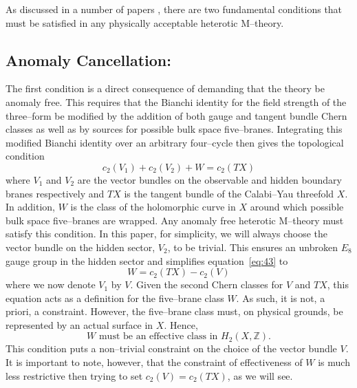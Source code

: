 \documentclass[a4paper,12pt]{article}
\numberwithin{equation}{section}
\theoremstyle{plain}
\begin{document}

As discussed in a number of papers \cite{nse, curio, lpt, GSW}, 
there are two fundamental conditions
that must be satisfied in any physically acceptable heterotic M--theory. 

\subsection*{Anomaly Cancellation:}

The first condition is a direct consequence of demanding that the theory be
anomaly free. This requires that the Bianchi identity for the field strength
of the three--form be modified by the addition of both gauge and tangent
bundle Chern classes as well as by sources for possible bulk space
five--branes. Integrating this modified Bianchi identity over an
arbitrary four--cycle then gives the topological condition
\[
c_{2}(V_{1})+c_{2}(V_{2})+W=c_{2}(TX)
\]
where $V_{1}$ and $V_{2}$ are the vector bundles on the observable and hidden
boundary branes respectively and $TX$ is the tangent bundle of the Calabi--Yau
threefold $X$. In addition, $W$ is the class of the holomorphic 
curve in $X$ around which possible bulk space five--branes are
wrapped. Any anomaly 
free heterotic M--theory must satisfy this condition. In this paper, for
simplicity, we will always choose the vector bundle on the hidden sector,
$V_{2}$, to be trivial. This ensures an unbroken $E_{8}$ gauge group in the
hidden sector and simplifies equation~\eqref{eq:43} to
\begin{equation}
W=c_{2}(TX)-c_{2}(V)
\label{eq:43}
\end{equation}
where we now denote $V_{1}$ by $V$. Given the second Chern classes for 
$V$ and $TX$, this equation acts as a definition for the five--brane class
$W$. As such, it is not, a priori, a constraint.
However, the five--brane class must, on physical grounds, be represented by an
 actual surface in $X$. Hence, 
\begin{equation}
W  \text{ must be an effective class in } H_{2}(X, {\mathbb Z}).
\label{eq:44}
\end{equation}
This condition puts a non--trivial constraint on the choice of the vector
bundle $V$. It is important to note, however, that the constraint of
effectiveness of $W$ is much less restrictive then trying to set
$c_{2}(V)=c_{2}(TX)$, as we will see.
\end{document}
